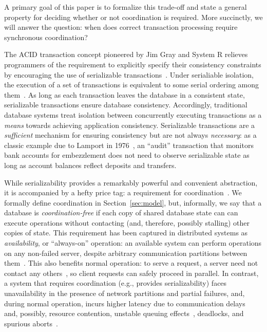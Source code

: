 A primary goal of this paper is to formalize this trade-off and state
a general property for deciding whether or not coordination is
required. More succinctly, we will answer the question: when does
correct transaction processing require synchronous coordination?


 The ACID transaction concept
pioneered by Jim Gray and System R relieves programmers of the
requirement to explicitly specify their consistency constraints by
encouraging the use of serializable
transactions~\cite{gray-virtues}. Under serialiable isolation, the
execution of a set of transactions is equivalent to some serial
ordering among them~\cite{bernstein-book}. As long as each transaction
leaves the database in a consistent state, serializable transactions
ensure database consistency. Accordingly, traditional database systems
treat isolation between concurrently executing transactions as a
\textit{means} towards achieving application consistency. Serializable
transactions are a \textit{sufficient} mechanism for ensuring
consistency but are not always \textit{necessary}: as a classic
example due to Lamport in
1976~\cite{lamport-audit,schneider-concurrent}, an ``audit''
transaction that monitors bank accounts for embezzlement does not need
to observe serializable state as long as account balances reflect
deposits and transfers.


 While serializability provides a
remarkably powerful and convenient abstraction, it is accompanied by a
hefty price tag: a requirement for
coordination~\cite{davidson-survey}. We formally define coordination
in Section~\ref{sec:model}, but, informally, we say that a database is
\textit{coordination-free} if each copy of shared database state can
can execute operations without contacting (and, therefore, possibly
stalling) other copies of state. This requirement has been captured in
distributed systems as \textit{availability}, or ``always-on''
operation: an available system can perform operations on any
non-failed server, despite arbitrary communication partitions between
them~\cite{gilbert-cap}. This also benefits normal operation: to serve
a request, a \cfree server need not contact any others~\cite{pacelc},
so client requests can safely proceed in parallel. In contrast, a
system that requires coordination (e.g., provides serializability)
faces unavailability in the presence of network partitions and partial
failures, and, during normal operation, incurs higher latency due to
communication delays~\cite{hat-vldb} and, possibly, resource
contention, unstable queuing effects~\cite{ladis}, deadlocks, and
spurious aborts~\cite{bernstein-book,gray-book,gray-virtues}.

